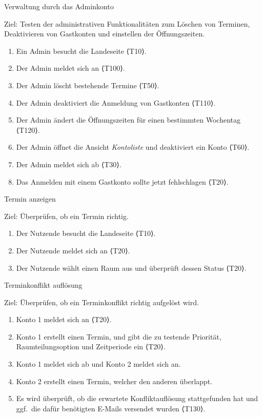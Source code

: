 \begin{scenario}{30}{Verwaltung durch das Adminkonto}
  \item[Ziel:] Testen der administrativen Funktionalitäten zum Löschen von Terminen, Deaktivieren von Gastkonten und einstellen der Öffnungszeiten.
  \begin{enumerate}
    \item Ein Admin besucht die Landeseite ⟨T10⟩.
    \item Der Admin meldet sich an ⟨T100⟩.
    \item Der Admin löscht bestehende Termine ⟨T50⟩.
    \item Der Admin deaktiviert die Anmeldung von Gastkonten ⟨T110⟩.
    \item Der Admin ändert die Öffnungszeiten für einen bestimmten Wochentag ⟨T120⟩.
    \item Der Admin öffnet die Ansicht \textit{Kontoliste} und deaktiviert ein Konto ⟨T60⟩.
    \item Der Admin meldet sich ab ⟨T30⟩.
    \item Das Anmelden mit einem Gastkonto sollte jetzt fehlschlagen ⟨T20⟩.
  \end{enumerate}
\end{scenario}

\begin{scenario}{40}{Termin anzeigen}
  \item[Ziel:] Überprüfen, ob ein Termin richtig.
  \begin{enumerate}
    \item Der Nutzende besucht die Landeseite ⟨T10⟩.
    \item Der Nutzende meldet sich an ⟨T20⟩.
    \item Der Nutzende wählt einen Raum aus und überprüft dessen Status ⟨T20⟩.
  \end{enumerate}
\end{scenario}

\begin{scenario}{50}{Terminkonflikt auflösung}
  \item[Ziel:] Überprüfen, ob ein Terminkonflikt richtig aufgelöst wird.
  \begin{enumerate}
    \item Konto 1 meldet sich an ⟨T20⟩.
    \item Konto 1 erstellt einen Termin, und gibt die zu testende Priorität, Raumteilungsoption und Zeitperiode ein ⟨T20⟩.
    \item Konto 1 meldet sich ab und Konto 2 meldet sich an.
    \item Konto 2 erstellt einen Termin, welcher den anderen überlappt.
    \item Es wird überprüft, ob die erwartete Konfliktauflösung stattgefunden hat und ggf.\ die dafür benötigten E-Mails versendet wurden ⟨T130⟩.
  \end{enumerate}
\end{scenario}







